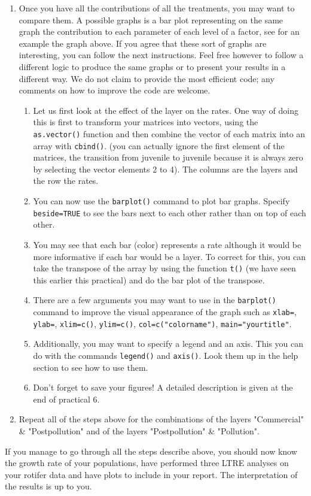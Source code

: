 \documentclass{article}\usepackage[]{graphicx}\usepackage[]{color}
\begin{document}
\begin{enumerate}
\item Once you have all the contributions of all the treatments, you may want to compare them. A possible graphs is a bar plot representing on the same graph the contribution to each parameter of each level of a factor, see for an example the graph above. If you agree that these sort of graphs are interesting, you can follow the next instructions. Feel free however to follow a different logic to produce the same graphs or to present your results in a different way. We do not claim to provide the most efficient code; any comments on how to improve the code are welcome.
\begin{enumerate}
\item Let us first look at the effect of the layer on the rates. One way of doing this is first to transform your matrices into vectors, using the \texttt{as.vector()} function and then combine the vector of each matrix into an array with \texttt{cbind()}. (you can actually ignore the first element of the matrices, the transition from juvenile to juvenile because it is always zero by selecting the vector elements 2 to 4). The columns are the layers and the row the rates. 
\item You can now use the \texttt{barplot()} command to plot bar graphs. Specify \texttt{beside=TRUE} to see the bars next to each other rather than on top of each other.
\item You may see that each bar (color) represents a rate although it would be more informative if each bar would be a layer. To correct for this, you can take the transpose of the array by using the function \texttt{t()} (we have seen this earlier this practical) and do the bar plot of the transpose. 
\item There are a few arguments you may want to use in the \texttt{barplot()} command to improve the visual appearance of the graph such as \texttt{xlab=}, \texttt{ylab=}, \texttt{xlim=c()}, \texttt{ylim=c()}, \texttt{col=c("colorname")}, \texttt{main="yourtitle"}.
\item Additionally, you may want to specify a legend and an axis. This you can do with the commands \texttt{legend()} and \texttt{axis()}. Look them up in the help section to see how to use them.
\item Don't forget to save your figures! A detailed description is given at the end of practical 6.
\end{enumerate}
\item Repeat all of the steps above for the combinations of the layers "Commercial" \& "Postpollution" and of the layers "Postpollution" \& "Pollution".
\end{enumerate}
If you manage to go through all the steps describe above, you should now know the growth rate of your populations, have performed three LTRE analyses on your rotifer data and have plots to include in your report. The interpretation of the results is up to you.
\end{document}
